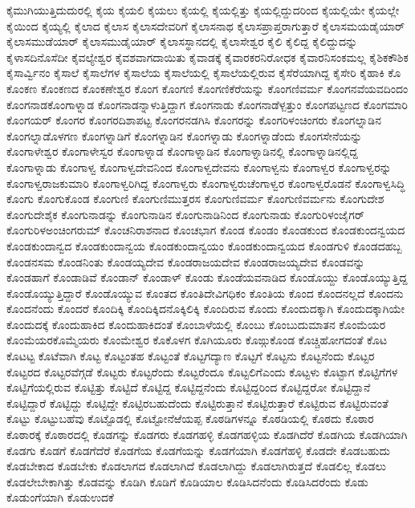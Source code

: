 {ಕೈಮುಗಿಯುತ್ತಿದುದುರಲ್ಲಿ
ಕೈಯ
ಕೈಯಲಿ
ಕೈಯಲು
ಕೈಯಲ್ಲಿ
ಕೈಯಲ್ಲಿತ್ತು
ಕೈಯಲ್ಲಿದ್ದುದರಿಂದ
ಕೈಯಲ್ಲಿಯೇ
ಕೈಯಲ್ಲೇ
ಕೈಯಿಂದ
ಕೈಯ್ಯಲ್ಲಿ
ಕೈಲಾದ
ಕೈಲಾಸ
ಕೈಲಾಸದೇವರಿಗೆ
ಕೈಲಾಸನಾಥ
ಕೈಲಾಸಪ್ರಾಪ್ತರಾಗುತ್ತಾರೆ
ಕೈಲಾಸಮಯಡೈಯಾರ್
ಕೈಲಾಸಮುಡೆಯಾರ್
ಕೈಲಾಸಮುಡೈಯಾರ್
ಕೈಲಾಸಸ್ಥಾನದಲ್ಲಿ
ಕೈಲಾಸೇಶ್ವರ
ಕೈಲಿ
ಕೈಲಿದ್ದ
ಕೈಲಿದ್ದುದನ್ನು
ಕೈಳಾಸದಿನೊಸೆದೀ
ಕೈವಲ್ಯೇಶ್ವರ
ಕೈವಶವಾಗದಾಯಿತು
ಕೈವಾಡಕ್ಕೆ
ಕೈವಾರಕರನಿರೋಧಕ
ಕೈವಾರನಿಸಂಕಮಲ್ಲ
ಕೈಶಿಕಕೌಶಿಕ
ಕೈಸಾರ್ವ್ವಿನಂ
ಕೈಸಾಲೆ
ಕೈಸಾಲೆಗಳ
ಕೈಸಾಲೆಯ
ಕೈಸಾಲೆಯಲ್ಲಿ
ಕೈಸಾಲೆಯಲ್ಲಿರುವ
ಕೈಸೆರೆಯಾಗಿದ್ದ
ಕೈಸೇರಿ
ಕೈಹಾಕಿ
ಕೊ
ಕೊಂಕಣ
ಕೊಂಕಣದ
ಕೊಂಕಣೇಶ್ವರ
ಕೊಂಗ
ಕೊಂಗಣಿ
ಕೊಂಗಣಿಕೆರೆಯನ್ನು
ಕೊಂಗಣಿವರ್ಮ
ಕೊಂಗನವೆಯವದಿಂದಂ
ಕೊಂಗನಾಡಕೊಂಗಾಳ್ನಾಡ
ಕೊಂಗನಾಡನ್ನಾಳುತ್ತಿದ್ದಾಗ
ಕೊಂಗನಾಡು
ಕೊಂಗನಾಡೆಳ್ಪತ್ತುಂ
ಕೊಂಗಪಟ್ಟಣದ
ಕೊಂಗಮಾರಿ
ಕೊಂಗಯರ್
ಕೊಂಗರ
ಕೊಂಗರದಿಶಾಪಟ್ಟ
ಕೊಂಗರನಡಗಿಸಿ
ಕೊಂಗರನ್ನು
ಕೊಂಗರಿಳಂಚಿಂಗರು
ಕೊಂಗಲ್ನಾಡಿನ
ಕೊಂಗಲ್ನಾಡೊಳಗಣ
ಕೊಂಗಳ್ನಾಡಿಗೆ
ಕೊಂಗಳ್ನಾಡಿನ
ಕೊಂಗಳ್ನಾಡು
ಕೊಂಗಳ್ನಾಡೆಂದು
ಕೊಂಗಸೇನೆಯನ್ನು
ಕೊಂಗಾಳೇಶ್ವರ
ಕೊಂಗಾಳೇಸ್ವರ
ಕೊಂಗಾಳ್ನಾಡ
ಕೊಂಗಾಳ್ನಾಡಿನ
ಕೊಂಗಾಳ್ನಾಡಿನಲ್ಲಿ
ಕೊಂಗಾಳ್ನಾಡಿನಲ್ಲಿದ್ದ
ಕೊಂಗಾಳ್ನಾಡು
ಕೊಂಗಾಳ್ವ
ಕೊಂಗಾಳ್ವದೇವನಿಂದ
ಕೊಂಗಾಳ್ವದೇವನು
ಕೊಂಗಾಳ್ವನು
ಕೊಂಗಾಳ್ವರ
ಕೊಂಗಾಳ್ವರನ್ನು
ಕೊಂಗಾಳ್ವರಾಜಕುಮಾರಿ
ಕೊಂಗಾಳ್ವರಿಗಿದ್ದ
ಕೊಂಗಾಳ್ವರು
ಕೊಂಗಾಳ್ವರುಚೆಂಗಾಳ್ವರ
ಕೊಂಗಾಳ್ವರೊಡನೆ
ಕೊಂಗಾಳ್ವಸಿದ್ಧಿ
ಕೊಂಗು
ಕೊಂಗುಕೊಂಡ
ಕೊಂಗುಣಿ
ಕೊಂಗುಣಿಮುತ್ತರಸ
ಕೊಂಗುಣಿವರ್ಮ
ಕೊಂಗುಣಿವರ್ಮನು
ಕೊಂಗುದೇಶ
ಕೊಂಗುದೇಶೈಕ
ಕೊಂಗುನಾಡನ್ನು
ಕೊಂಗುನಾಡಿನ
ಕೊಂಗುನಾಡಿನಿಂದ
ಕೊಂಗುನಾಡು
ಕೊಂಗುರಿಳಂಜೈಗರ್
ಕೊಂಗುರಿಳಅಂಚಿಂಗರುಮ್
ಕೊಂಚನಿರಾಶನಾದ
ಕೊಂಚಭಾಗ
ಕೊಂಡ
ಕೊಂಡಂ
ಕೊಂಡಕುಂದ
ಕೊಂಡಕುಂದನ್ವಯದ
ಕೊಂಡಕುಂದಾನ್ವದ
ಕೊಂಡಕುಂದಾನ್ವಯ
ಕೊಂಡಕುಂದಾನ್ವಯಂ
ಕೊಂಡಕುಂದಾನ್ವಯದ
ಕೊಂಡಗುಳಿ
ಕೊಂಡದಹಬ್ಬ
ಕೊಂಡನಸಮ
ಕೊಂಡನಿಂತು
ಕೊಂಡಯ್ಯದೇವ
ಕೊಂಡರಾಜಯದೇವ
ಕೊಂಡರಾಜಯ್ಯದೇವ
ಕೊಂಡವನ್ನು
ಕೊಂಡಹಾಗೆ
ಕೊಂಡಾಡಿವೆ
ಕೊಂಡಾನ್
ಕೊಂಡಾಳ್
ಕೊಂಡು
ಕೊಂಡೆಯವನಾಡಿದ
ಕೊಂಡೊಯ್ದು
ಕೊಂಡೊಯ್ಯುತ್ತಿದ್ದ
ಕೊಂಡೊಯ್ಯುತ್ತಿದ್ದಾರೆ
ಕೊಂಡೊಯ್ಯುವ
ಕೊಂತದ
ಕೊಂತಿದೇವಿಗಧಿಕಂ
ಕೊಂತಿಯ
ಕೊಂದ
ಕೊಂದನಲ್ಲದೆ
ಕೊಂದನು
ಕೊಂದನೆಂದು
ಕೊಂದರೆ
ಕೊಂದಿಕ್ಕಿ
ಕೊಂದಿಕ್ಕಿದನೊಕ್ಕಿಲಿಕ್ಕಿ
ಕೊಂದಿರುವ
ಕೊಂದು
ಕೊಂದುದಕ್ಕಾಗಿ
ಕೊಂದುದಕ್ಕಾಗಿಯೇ
ಕೊಂದುದಕ್ಕೆ
ಕೊಂದುಹಾಕಿದ
ಕೊಂದುಹಾಕಿದಂತೆ
ಕೊಂಬಾಳೆಯಲ್ಲಿ
ಕೊಂಬು
ಕೊಂಬುದುಮಾತನ
ಕೊಂಮೆಯರ
ಕೊಂಮೆಯರಕೊಮ್ಮೆಯರು
ಕೊಂಮೇಶ್ವರ
ಕೊಕೊಳಗ
ಕೊಗಿಯೂರು
ಕೊಙ್ಗುಕೊಂಡ
ಕೊಚ್ಚಿಹೋಗದಂತೆ
ಕೊಟ
ಕೊಟಟ್ಟ
ಕೊಟೆವಾಗಿ
ಕೊಟ್ಟ
ಕೊಟ್ಟಂತಹ
ಕೊಟ್ಟಂತೆ
ಕೊಟ್ಟಗದ್ಯಾಣ
ಕೊಟ್ಟಗೆ
ಕೊಟ್ಟನು
ಕೊಟ್ಟನೆಂದು
ಕೊಟ್ಟರ
ಕೊಟ್ಟರದ
ಕೊಟ್ಟರವೆಗ್ಗಡೆ
ಕೊಟ್ಟರು
ಕೊಟ್ಟರೆಂದು
ಕೊಟ್ಟರೆಂದೂ
ಕೊಟ್ಟಲಿಗೆಎಂದು
ಕೊಟ್ಟಳು
ಕೊಟ್ಟಾಗ
ಕೊಟ್ಟಿಗೆಗಳ
ಕೊಟ್ಟಿಗೆಯಲ್ಲಿರುವ
ಕೊಟ್ಟಿತ್ತು
ಕೊಟ್ಟಿದೆ
ಕೊಟ್ಟಿದ್ದ
ಕೊಟ್ಟಿದ್ದನೆಂದು
ಕೊಟ್ಟಿದ್ದರಿಂದ
ಕೊಟ್ಟಿದ್ದರೋ
ಕೊಟ್ಟಿದ್ದಾನೆ
ಕೊಟ್ಟಿದ್ದಾರೆ
ಕೊಟ್ಟಿದ್ದು
ಕೊಟ್ಟಿದ್ದೇ
ಕೊಟ್ಟಿರಬಹುದೆಂದು
ಕೊಟ್ಟಿರುತ್ತಾನೆ
ಕೊಟ್ಟಿರುತ್ತಾರೆ
ಕೊಟ್ಟಿರುವ
ಕೊಟ್ಟಿರುವಂತೆ
ಕೊಟ್ಟು
ಕೊಟ್ಟುಬಹೆವು
ಕೊಟ್ಟೊಡಲ್ಲಿ
ಕೊಟ್ಟೋನೆಱೆಯಪ್ಪ
ಕೊಠಡಿಗಳನ್ನೂ
ಕೊಠಡಿಯಲ್ಲಿ
ಕೊಠದು
ಕೊಠಾರ
ಕೊಠಾರಕ್ಕೆ
ಕೊಠಾರದಲ್ಲಿ
ಕೊಡಗನ್ನು
ಕೊಡಗರು
ಕೊಡಗಹಳ್ಳಿ
ಕೊಡಗಹಳ್ಳಿಯ
ಕೊಡಗಿದೆರೆ
ಕೊಡಗಿಯ
ಕೊಡಗಿಯಾಗಿ
ಕೊಡಗು
ಕೊಡಗೆ
ಕೊಡಗೆದೆರೆ
ಕೊಡಗೆಯ
ಕೊಡಗೆಯನ್ನು
ಕೊಡಗೆಯಾಗಿ
ಕೊಡಗೆಹಳ್ಳಿ
ಕೊಡದೇ
ಕೊಡಬಹುದು
ಕೊಡಬೇಕಾದ
ಕೊಡಬೇಕು
ಕೊಡಲಾಗದ
ಕೊಡಲಾಗಿದೆ
ಕೊಡಲಾಗಿದ್ದು
ಕೊಡಲಾಗಿರುತ್ತದೆ
ಕೊಡಲಿಲ್ಲ
ಕೊಡಲು
ಕೊಡಲೇಬೇಕಾಗಿತ್ತು
ಕೊಡವನ್ನು
ಕೊಡಿಗಿ
ಕೊಡಿಗೆ
ಕೊಡಿಯಾಲ
ಕೊಡಿಸಿದನೆಂದು
ಕೊಡಿಸಿದರೆಂದು
ಕೊಡು
ಕೊಡುಂಗೆಯಾಗಿ
ಕೊಡುಉದಕೆ
}
